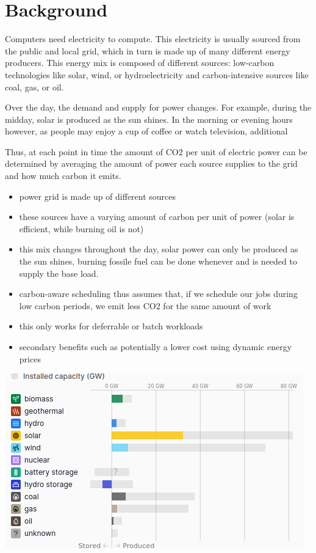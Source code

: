 \chapter{Background}




Computers need electricity to compute. 
This electricity is usually sourced from the public and local grid, which in turn is made up of many different energy producers. This energy mix is composed of different sources: low-carbon technologies like solar, wind, or hydroelectricity and carbon-intensive sources like coal, gas, or oil.

Over the day, the demand and supply for power changes. For example, during the midday, solar is produced as the sun shines. In the morning or evening hours however, as people may enjoy a cup of coffee or watch television, additional 

Thus, at each point in time the amount of CO2 per unit of electric power can be determined by averaging the amount of power each source supplies to the grid and how much carbon it emits.

\begin{itemize}
    \item power grid is made up of different sources
    \item these sources have a varying amount of carbon per unit of power (solar is efficient, while burning oil is not)
    \item this mix changes throughout the day, solar power can only be produced as the sun shines, burning fossile fuel can be done whenever and is needed to supply the base load.
    \item carbon-aware scheduling thus assumes that, if we schedule our jobs during low carbon periods, we emit less CO2 for the same amount of work
    \item this only works for deferrable or batch workloads \cite{tanenbaum_operating_2006}
    \item secondary benefits such as potentially a lower cost using dynamic energy prices
\end{itemize}


\includegraphics[width=\linewidth]{images/2_background2024-08-20-15-28-19.png}


